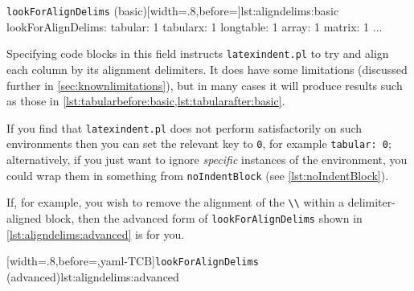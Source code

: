 	\begin{yaml}[numbers=none]{\texttt{lookForAlignDelims} (basic)}[width=.8\linewidth,before=\centering]{lst:aligndelims:basic}
lookForAlignDelims:
   tabular: 1
   tabularx: 1
   longtable: 1
   array: 1
   matrix: 1
   ...
	\end{yaml}

	Specifying code blocks in this field instructs \texttt{latexindent.pl} to try and align
	each column by its alignment delimiters. It does have some limitations (discussed further
	in \cref{sec:knownlimitations}), but in many cases it will produce results such as those
	in \cref{lst:tabularbefore:basic,lst:tabularafter:basic}.

	If you find that \texttt{latexindent.pl} does not perform satisfactorily on such
	environments then you can set the relevant key to \texttt{0}, for example
	\texttt{tabular: 0}; alternatively, if you just want to ignore \emph{specific} instances
	of the environment, you could wrap them in something from \texttt{noIndentBlock} (see
	\vref{lst:noIndentBlock}).

	\begin{cmhtcbraster}
	\end{cmhtcbraster}

	If, for example, you wish to remove the alignment of the \lstinline!\\! within a
	delimiter-aligned block, then the advanced form of \texttt{lookForAlignDelims} shown in
	\cref{lst:aligndelims:advanced} is for you. 
	   

	[width=.8\linewidth,before=\centering,yaml-TCB]{\texttt{lookForAlignDelims} (advanced)}{lst:aligndelims:advanced}

